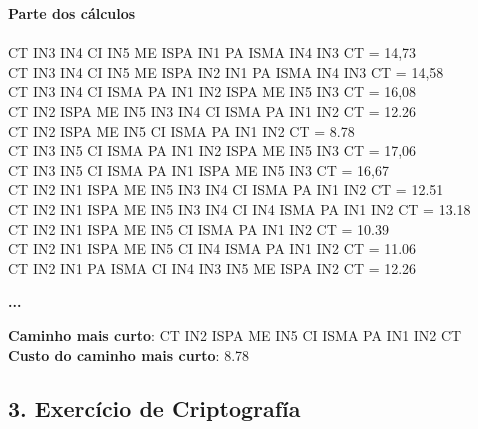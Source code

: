 \documentclass[12pt]{article}
\begin{document}
    \newpage    
    \noindent\textbf{ Parte dos cálculos}\\\\
    CT IN3 IN4 CI IN5 ME ISPA IN1 PA ISMA IN4 IN3 CT = 14,73\\
    CT IN3 IN4 CI IN5 ME ISPA IN2 IN1 PA ISMA IN4 IN3 CT = 14,58\\
    CT IN3 IN4 CI ISMA PA IN1 IN2 ISPA ME IN5 IN3 CT = 16,08\\
    CT IN2 ISPA ME IN5 IN3 IN4 CI ISMA PA IN1 IN2 CT = 12.26\\
    CT IN2 ISPA ME IN5 CI ISMA PA IN1 IN2 CT = 8.78\\
    CT IN3 IN5 CI ISMA PA IN1 IN2 ISPA ME IN5 IN3 CT = 17,06\\
    CT IN3 IN5 CI ISMA PA IN1 ISPA ME IN5 IN3 CT = 16,67\\
    CT IN2 IN1 ISPA ME IN5 IN3 IN4 CI ISMA PA IN1 IN2 CT = 12.51\\
    CT IN2 IN1 ISPA ME IN5 IN3 IN4 CI IN4 ISMA PA IN1 IN2 CT = 13.18\\
    CT IN2 IN1 ISPA ME IN5 CI ISMA PA IN1 IN2 CT = 10.39\\
    CT IN2 IN1 ISPA ME IN5 CI IN4 ISMA PA IN1 IN2 CT = 11.06\\
    CT IN2 IN1 PA ISMA CI IN4 IN3 IN5 ME ISPA IN2 CT = 12.26
    \begin{center}
         \textbf{...}
    \end{center}
    \noindent \textbf{Caminho mais curto}:  CT IN2 ISPA ME IN5 CI ISMA PA IN1 IN2 CT\\
    \noindent \textbf{Custo do caminho mais curto}: 8.78
    
    \newpage
    \subsection{3. Exercício de Criptografía}
    
    \begin{table}[hbt!]
    \end{table}
    
\end{document}
